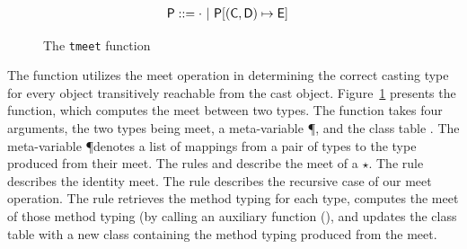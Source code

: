 \documentclass[a4paper,USenglish]{tex/lipics-v2016}
\begin{document}
\begin{figure}[!ht]
\opdef{
  $\tmeet{\t}{\tp}\P\K = \tpp\,\Kp$
}{
}
\begin{align*}
\P &::= \cdot \B \Map\P{\Bind{(\C,\D)}\E}
\end{align*}
\begin{mathpar}




\end{mathpar}
\caption{The \texttt{tmeet} function}
\label{fig:tmeet_fun}
\end{figure}

The  function utilizes the meet operation in determining the correct
casting type for every object transitively reachable from the cast object. 
Figure~\ref{fig:tmeet_fun} presents the  function, which computes
the meet between two types. The  function takes four arguments,
the two types being meet, a meta-variable \P, and the class table \K. 
The meta-variable \P denotes a list of mappings 
from a pair of types to the type produced from their meet. The rules
 and  describe the meet of a $\star$. The rule
 describes the identity meet. The rule  describes
the recursive case of our meet operation. 
The rule  retrieves the method typing for each type, computes 
the meet of those method typing (by calling an auxiliary function (),
and updates the class table with a new class containing the method typing 
produced from the meet.
\end{document}
